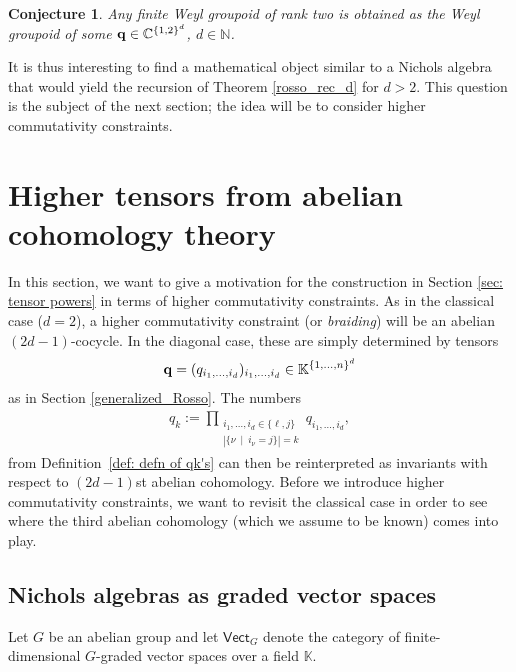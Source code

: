 \documentclass[10pt,a4paper]{amsart}
\numberwithin{equation}{section}
\newtheorem{conje}[Theorem]{Conjecture}
\newcommand{\NN }{\mathbb{N}}
\newcommand{\CC }{\mathbb{C}}
\newcommand{\qq }{{\bf q}}
\newcommand{\KK }{\mathbb{K}}
\newcommand{\dn }{d}
\begin{document}
\begin{conje}
Any finite Weyl groupoid of rank two is obtained as the Weyl groupoid of some $\qq\in \CC^{\{1,2\}^\dn}$, $\dn\in\NN$.
\end{conje}

It is thus interesting to find a mathematical object similar to a Nichols algebra that would yield the recursion
of Theorem \ref{rosso_rec_d}
for $\dn>2$. This question is the subject of the next section; the idea will be to consider higher commutativity constraints.

\section{Higher tensors from abelian cohomology theory}\label{ab_coh}

In this section, we want to give a motivation for the construction in Section \ref{sec: tensor powers} in terms of higher commutativity constraints. As in the classical case ($d=2$), a higher commutativity constraint (or \textit{braiding}) will be an abelian $(2d-1)$-cocycle. In the diagonal case, these are simply determined by tensors
\[\qq = (q_{i_1,\dots,i_\dn})_{i_1,\dots,i_\dn}\in \KK^{\{1,\dots,n\}^\dn}\]
as in Section \ref{generalized_Rosso}. The numbers
\begin{align*}
 q_k :=\prod_{\substack{i_1,\dots,i_\dn\in\{\ell,j\}\\ |\{\nu\:\mid\: i_\nu=j\}|=k}} q_{i_1,\dots,i_\dn},
\end{align*}
from Definition~\ref{def: defn of qk's} can then be reinterpreted as invariants with respect to $(2d-1)$st abelian cohomology. Before we introduce higher commutativity constraints, we want to revisit the classical case in order to see where the third abelian cohomology (which we assume to be known) comes into play.

\subsection{Nichols algebras as graded vector spaces}

Let $G$ be an abelian group and let $\mathsf{Vect}_G$ denote the category of finite-dimensional $G$-graded vector spaces over a field $\KK$.
\end{document}
